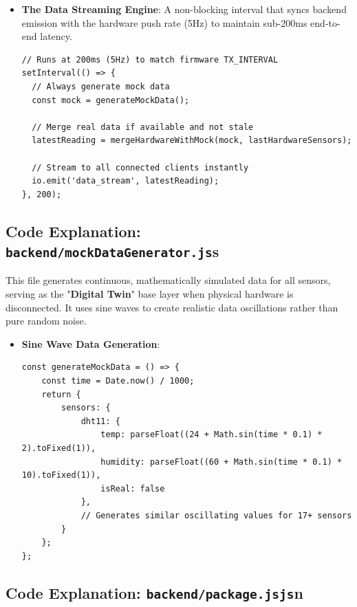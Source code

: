 \documentclass[12pt,a4paper]{article}
\newcommand{\keyword}[1]{\textcolor{keywordcolor}{\textbf{#1}}}
\newcommand{\Q}[1]{\textcolor{questioncolor}{\textbf{#1}}}
\newcommand{\codeinline}[1]{\texttt{\small #1}}
\begin{document}
\begin{itemize}
    \item \Q{The Data Streaming Engine}:
    A non-blocking interval that syncs backend emission with the hardware push rate (5Hz) to maintain sub-200ms end-to-end latency.
\begin{verbatim}
// Runs at 200ms (5Hz) to match firmware TX_INTERVAL
setInterval(() => {
  // Always generate mock data
  const mock = generateMockData();
  
  // Merge real data if available and not stale
  latestReading = mergeHardwareWithMock(mock, lastHardwareSensors);
  
  // Stream to all connected clients instantly
  io.emit('data_stream', latestReading);
}, 200); 
\end{verbatim}
\end{itemize}

\vspace{0.5cm}

\subsection*{Code Explanation: \codeinline{backend/mockDataGenerator.js}s}

This file generates continuous, mathematically simulated data for all sensors, serving as the "\keyword{Digital Twin}" base layer when physical hardware is disconnected. It uses sine waves to create realistic data oscillations rather than pure random noise.

\begin{itemize}
    \item \Q{Sine Wave Data Generation}:
\begin{verbatim}
const generateMockData = () => {
    const time = Date.now() / 1000;
    return {
        sensors: {
            dht11: {
                temp: parseFloat((24 + Math.sin(time * 0.1) * 2).toFixed(1)),
                humidity: parseFloat((60 + Math.sin(time * 0.1) * 10).toFixed(1)),
                isReal: false
            },
            // Generates similar oscillating values for 17+ sensors
        }
    };
};
\end{verbatim}
\end{itemize}

\vspace{0.5cm}

\subsection*{Code Explanation: \codeinline{backend/package.jsjs}n}
\end{document}
